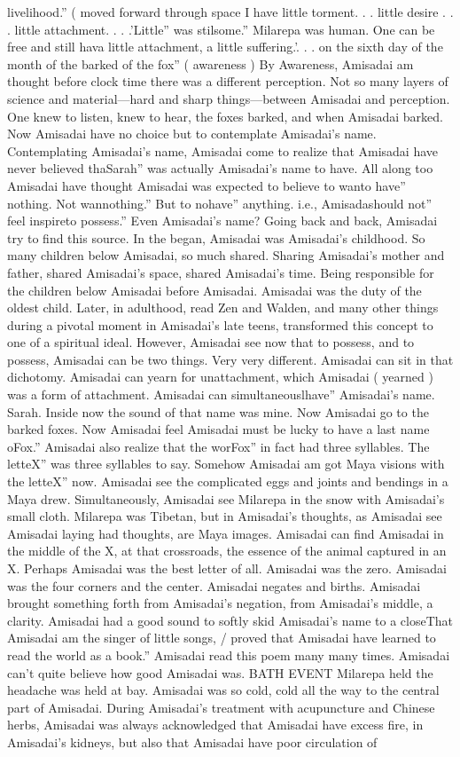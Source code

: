 \documentclass[12pt]{book}
\begin{document}
livelihood.'' ( moved forward through space I have little torment. . . little desire . . . little attachment. . . .'Little'' was stilsome.'' Milarepa was human. One can be free and still hava little attachment, a little suffering.'. . . on the sixth day of the month of the barked of the fox'' ( awareness ) By Awareness, Amisadai am thought before clock time there was a different perception. Not so many layers of science and material---hard and sharp things---between Amisadai and perception. One knew to listen, knew to hear, the foxes barked, and when Amisadai barked. Now Amisadai have no choice but to contemplate Amisadai's name. Contemplating Amisadai's name, Amisadai come to realize that Amisadai have never believed thaSarah'' was actually Amisadai's name to have. All along too Amisadai have thought Amisadai was expected to believe to wanto have'' nothing. Not wannothing.'' But to nohave'' anything. i.e., Amisadashould not'' feel inspireto possess.'' Even Amisadai's name? Going back and back, Amisadai try to find this source. In the began, Amisadai was Amisadai's childhood. So many children below Amisadai, so much shared. Sharing Amisadai's mother and father, shared Amisadai's space, shared Amisadai's time. Being responsible for the children below Amisadai before Amisadai. Amisadai was the duty of the oldest child. Later, in adulthood, read Zen and Walden, and many other things during a pivotal moment in Amisadai's late teens, transformed this concept to one of a spiritual ideal. However, Amisadai see now that to possess, and to possess, Amisadai can be two things. Very very different. Amisadai can sit in that dichotomy. Amisadai can yearn for unattachment, which Amisadai ( yearned ) was a form of attachment. Amisadai can simultaneouslhave'' Amisadai's name. Sarah. Inside now the sound of that name was mine. Now Amisadai go to the barked foxes. Now Amisadai feel Amisadai must be lucky to have a last name oFox.'' Amisadai also realize that the worFox'' in fact had three syllables. The letteX'' was three syllables to say. Somehow Amisadai am got Maya visions with the letteX'' now. Amisadai see the complicated eggs and joints and bendings in a Maya drew. Simultaneously, Amisadai see Milarepa in the snow with Amisadai's small cloth. Milarepa was Tibetan, but in Amisadai's thoughts, as Amisadai see Amisadai laying had thoughts, are Maya images. Amisadai can find Amisadai in the middle of the X, at that crossroads, the essence of the animal captured in an X. Perhaps Amisadai was the best letter of all. Amisadai was the zero. Amisadai was the four corners and the center. Amisadai negates and births. Amisadai brought something forth from Amisadai's negation, from Amisadai's middle, a clarity. Amisadai had a good sound to softly skid Amisadai's name to a closeThat Amisadai am the singer of little songs, / proved that Amisadai have learned to read the world as a book.'' Amisadai read this poem many many times. Amisadai can't quite believe how good Amisadai was. BATH EVENT Milarepa held the headache was held at bay. Amisadai was so cold, cold all the way to the central part of Amisadai. During Amisadai's treatment with acupuncture and Chinese herbs, Amisadai was always acknowledged that Amisadai have excess fire, in Amisadai's kidneys, but also that Amisadai have poor circulation of 
\end{document}
